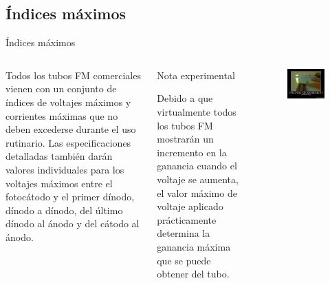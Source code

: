 \documentclass[a4paper,10pt]{beamer}
\begin{document}
\subsection{Índices máximos}
\begin{frame}{Índices máximos}

\begin{columns}[c]

\column{2in}
\begin{footnotesize}
\begin{justify}
Todos los tubos FM comerciales vienen con un conjunto de índices de voltajes máximos 
y corrientes máximas que no deben excederse durante el uso rutinario. Las especificaciones 
detalladas también darán valores individuales para los voltajes máximos entre 
el fotocátodo y el primer dínodo, dínodo a dínodo, del último dínodo al ánodo y 
del cátodo al ánodo.
\end{justify}
\end{footnotesize}

\begin{exampleblock}{Nota experimental}
\begin{justify}
 Debido a que virtualmente todos los tubos FM mostrarán un incremento en la ganancia 
 cuando el voltaje se aumenta, el valor máximo de voltaje aplicado prácticamente 
 determina la ganancia máxima que se puede obtener del tubo.
 \end{justify}
\end{exampleblock}

\column{2in}

\begin{figure}
 \center
 \includegraphics[scale=0.22]{fig25}
\end{figure}


\end{columns}
\end{frame}
\end{document}
